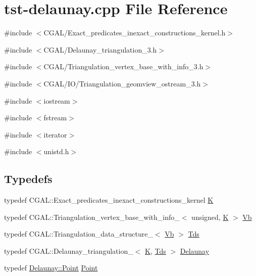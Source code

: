 \hypertarget{tst-delaunay_8cpp}{
\section{tst-\/delaunay.cpp File Reference}
\label{tst-delaunay_8cpp}
}
{\ttfamily \#include $<$CGAL/Exact\_\-predicates\_\-inexact\_\-constructions\_\-kernel.h$>$}\par
{\ttfamily \#include $<$CGAL/Delaunay\_\-triangulation\_\-3.h$>$}\par
{\ttfamily \#include $<$CGAL/Triangulation\_\-vertex\_\-base\_\-with\_\-info\_\-3.h$>$}\par
{\ttfamily \#include $<$CGAL/IO/Triangulation\_\-geomview\_\-ostream\_\-3.h$>$}\par
{\ttfamily \#include $<$iostream$>$}\par
{\ttfamily \#include $<$fstream$>$}\par
{\ttfamily \#include $<$iterator$>$}\par
{\ttfamily \#include $<$unistd.h$>$}\par
\subsection*{Typedefs}
\begin{DoxyCompactItemize}
\item 
typedef CGAL::Exact\_\-predicates\_\-inexact\_\-constructions\_\-kernel \hyperlink{tst-delaunay_8cpp_a891e241aa245ae63618f03737efba309}{K}
\item 
typedef CGAL::Triangulation\_\-vertex\_\-base\_\-with\_\-info\_$<$ unsigned, \hyperlink{tst__info_8cpp_a891e241aa245ae63618f03737efba309}{K} $>$ \hyperlink{tst-delaunay_8cpp_a3bf8a2b64134355d805171df5dc05101}{Vb}
\item 
typedef CGAL::Triangulation\_\-data\_\-structure\_$<$ \hyperlink{tst__info_8cpp_a3bf8a2b64134355d805171df5dc05101}{Vb} $>$ \hyperlink{tst-delaunay_8cpp_a2c94e68b962973b8c8da8aa0fa8f7a47}{Tds}
\item 
typedef CGAL::Delaunay\_\-triangulation\_$<$ \hyperlink{tst__info_8cpp_a891e241aa245ae63618f03737efba309}{K}, \hyperlink{tst__info_8cpp_a2c94e68b962973b8c8da8aa0fa8f7a47}{Tds} $>$ \hyperlink{tst-delaunay_8cpp_aaca765768a8bc0aed856b44d4f9e10e2}{Delaunay}
\item 
typedef \hyperlink{tst__info_8cpp_aa5acf70a1c48c8f9446423f5522abeb8}{Delaunay::Point} \hyperlink{tst-delaunay_8cpp_aa5acf70a1c48c8f9446423f5522abeb8}{Point}
\end{DoxyCompactItemize}
